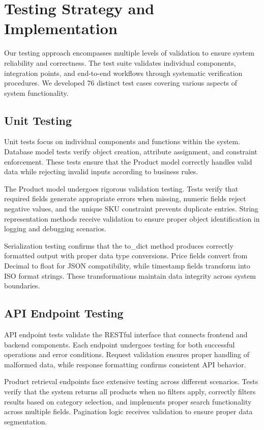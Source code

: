 \documentclass[12pt,a4paper]{article}
\begin{document}
\section{Testing Strategy and Implementation}

Our testing approach encompasses multiple levels of validation to ensure system reliability and correctness. The test suite validates individual components, integration points, and end-to-end workflows through systematic verification procedures. We developed 76 distinct test cases covering various aspects of system functionality.

\subsection{Unit Testing}

Unit tests focus on individual components and functions within the system. Database model tests verify object creation, attribute assignment, and constraint enforcement. These tests ensure that the Product model correctly handles valid data while rejecting invalid inputs according to business rules.

The Product model undergoes rigorous validation testing. Tests verify that required fields generate appropriate errors when missing, numeric fields reject negative values, and the unique SKU constraint prevents duplicate entries. String representation methods receive validation to ensure proper object identification in logging and debugging scenarios.

Serialization testing confirms that the to\_dict method produces correctly formatted output with proper data type conversions. Price fields convert from Decimal to float for JSON compatibility, while timestamp fields transform into ISO format strings. These transformations maintain data integrity across system boundaries.

\subsection{API Endpoint Testing}

API endpoint tests validate the RESTful interface that connects frontend and backend components. Each endpoint undergoes testing for both successful operations and error conditions. Request validation ensures proper handling of malformed data, while response formatting confirms consistent API behavior.

Product retrieval endpoints face extensive testing across different scenarios. Tests verify that the system returns all products when no filters apply, correctly filters results based on category selection, and implements proper search functionality across multiple fields. Pagination logic receives validation to ensure proper data segmentation.
\end{document}

